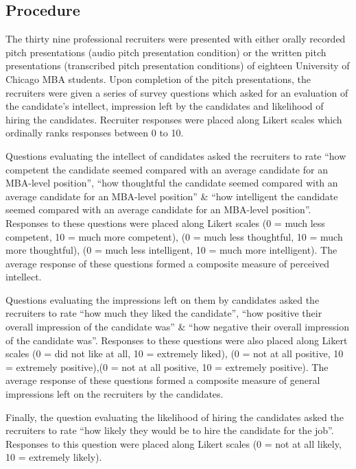 \documentclass[
  english,
  man,floatsintext]{apa6}
\begin{document}
\hypertarget{procedure}{%
\subsection{Procedure}\label{procedure}}

The thirty nine professional recruiters were presented with either orally recorded pitch presentations (audio pitch presentation condition) or the written pitch presentations (transcribed pitch presentation conditions) of eighteen University of Chicago MBA students. Upon completion of the pitch presentations, the recruiters were given a series of survey questions which asked for an evaluation of the candidate's intellect, impression left by the candidates and likelihood of hiring the candidates. Recruiter responses were placed along Likert scales which ordinally ranks responses between 0 to 10.

Questions evaluating the intellect of candidates asked the recruiters to rate \enquote{how competent the candidate seemed compared with an average candidate for an MBA-level position}, \enquote{how thoughtful the candidate seemed compared with an average candidate for an MBA-level position} \& \enquote{how intelligent the candidate seemed compared with an average candidate for an MBA-level position}. Responses to these questions were placed along Likert scales (0 = much less competent, 10 = much more competent), (0 = much less thoughtful, 10 = much more thoughtful), (0 = much less intelligent, 10 = much more intelligent). The average response of these questions formed a composite measure of perceived intellect.

Questions evaluating the impressions left on them by candidates asked the recruiters to rate \enquote{how much they liked the candidate}, \enquote{how positive their overall impression of the candidate was} \& \enquote{how negative their overall impression of the candidate was}. Responses to these questions were also placed along Likert scales (0 = did not like at all, 10 = extremely liked), (0 = not at all positive, 10 = extremely positive),(0 = not at all positive, 10 = extremely positive). The average response of these questions formed a composite measure of general impressions left on the recruiters by the candidates.

Finally, the question evaluating the likelihood of hiring the candidates asked the recruiters to rate \enquote{how likely they would be to hire the candidate for the job}. Responses to this question were placed along Likert scales (0 = not at all likely, 10 = extremely likely).
\end{document}
